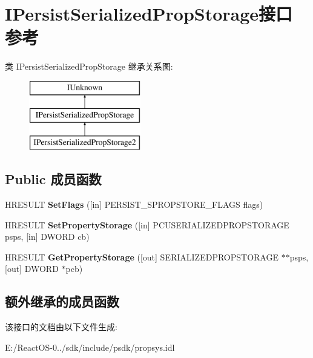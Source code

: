 \hypertarget{interface_i_persist_serialized_prop_storage}{}\section{I\+Persist\+Serialized\+Prop\+Storage接口 参考}
\label{interface_i_persist_serialized_prop_storage}
类 I\+Persist\+Serialized\+Prop\+Storage 继承关系图\+:\begin{figure}[H]
\begin{center}
\leavevmode
\includegraphics[height=3.000000cm]{interface_i_persist_serialized_prop_storage}
\end{center}
\end{figure}
\subsection*{Public 成员函数}
\begin{DoxyCompactItemize}
\item 
\mbox{\label{interface_i_persist_serialized_prop_storage_a0791cd7d4362aeaf55701d13bab8e01a}} 
H\+R\+E\+S\+U\+LT {\bfseries Set\+Flags} (\mbox{[}in\mbox{]} P\+E\+R\+S\+I\+S\+T\+\_\+\+S\+P\+R\+O\+P\+S\+T\+O\+R\+E\+\_\+\+F\+L\+A\+GS flags)
\item 
\mbox{\label{interface_i_persist_serialized_prop_storage_a7b1c885e61dfd41176b1ed588d3a6f2c}} 
H\+R\+E\+S\+U\+LT {\bfseries Set\+Property\+Storage} (\mbox{[}in\mbox{]} P\+C\+U\+S\+E\+R\+I\+A\+L\+I\+Z\+E\+D\+P\+R\+O\+P\+S\+T\+O\+R\+A\+GE psps, \mbox{[}in\mbox{]} D\+W\+O\+RD cb)
\item 
\mbox{\label{interface_i_persist_serialized_prop_storage_a24fa0ae97819c2bb8023d25eafa9edbe}} 
H\+R\+E\+S\+U\+LT {\bfseries Get\+Property\+Storage} (\mbox{[}out\mbox{]} S\+E\+R\+I\+A\+L\+I\+Z\+E\+D\+P\+R\+O\+P\+S\+T\+O\+R\+A\+GE $\ast$$\ast$psps, \mbox{[}out\mbox{]} D\+W\+O\+RD $\ast$pcb)
\end{DoxyCompactItemize}
\subsection*{额外继承的成员函数}


该接口的文档由以下文件生成\+:\begin{DoxyCompactItemize}
\item 
E\+:/\+React\+O\+S-\/0../sdk/include/psdk/propsys.\+idl\end{DoxyCompactItemize}
